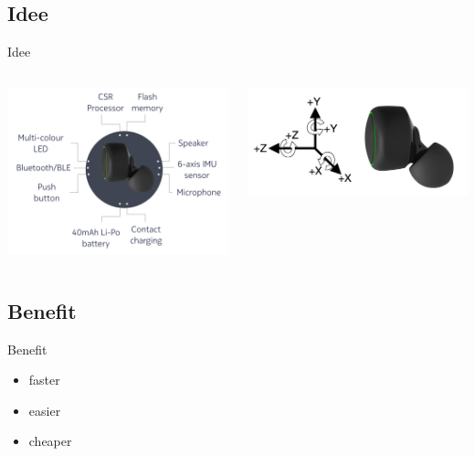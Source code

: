 \documentclass[18pt]{beamer}
\begin{document}
\subsection{Idee}
\begin{frame}{Idee}
    \begin{columns}[T] %
	\begin{column}{.48\textwidth}
	    \includegraphics[scale=0.15]{logos/esense}
	\end{column}%
	\hfill%
	\begin{column}{.48\textwidth}
	    \includegraphics[scale=0.25]{logos/esense2}
	\end{column}%
    \end{columns}
\end{frame}

\subsection{Benefit}
\begin{frame}{Benefit}
    \begin{itemize}
	\item faster
	\item easier
	\item cheaper
    \end{itemize}
\end{frame}
\end{document}
